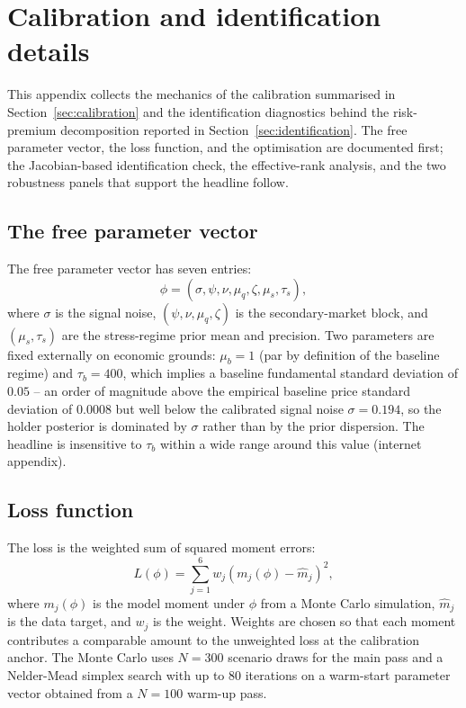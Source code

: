 \section{Calibration and identification details}\label{app:calib_details}

This appendix collects the mechanics of the calibration summarised in Section~\ref{sec:calibration} and the identification diagnostics behind the risk-premium decomposition reported in Section~\ref{sec:identification}. The free parameter vector, the loss function, and the optimisation are documented first; the Jacobian-based identification check, the effective-rank analysis, and the two robustness panels that support the headline follow.

\subsection{The free parameter vector}\label{sub:free_params}

The free parameter vector has seven entries:
\begin{equation}\label{eq:phi}
\phi = (\sigma, \psi, \nu, \mu_q, \zeta, \mu_s, \tau_s),
\end{equation}
where $\sigma$ is the signal noise, $(\psi, \nu, \mu_q, \zeta)$ is the secondary-market block, and $(\mu_s, \tau_s)$ are the stress-regime prior mean and precision. Two parameters are fixed externally on economic grounds: $\mu_b = 1$ (par by definition of the baseline regime) and $\tau_b = 400$, which implies a baseline fundamental standard deviation of $0.05$ -- an order of magnitude above the empirical baseline price standard deviation of $0.0008$ but well below the calibrated signal noise $\sigma = 0.194$, so the holder posterior is dominated by $\sigma$ rather than by the prior dispersion. The headline is insensitive to $\tau_b$ within a wide range around this value (internet appendix).

\subsection{Loss function}\label{sub:loss}

The loss is the weighted sum of squared moment errors:
\begin{equation}\label{eq:loss}
L(\phi) = \sum_{j=1}^{6} w_j (m_j(\phi) - \hat m_j)^2,
\end{equation}
where $m_j(\phi)$ is the model moment under $\phi$ from a Monte Carlo simulation, $\hat m_j$ is the data target, and $w_j$ is the weight. Weights are chosen so that each moment contributes a comparable amount to the unweighted loss at the calibration anchor. The Monte Carlo uses $N=300$ scenario draws for the main pass and a Nelder-Mead simplex search with up to 80 iterations on a warm-start parameter vector obtained from a $N=100$ warm-up pass.

